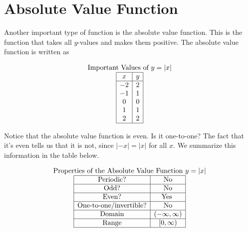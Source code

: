 \documentclass[nooutcomes]{ximera}
\begin{document}
\newpage


\section{Absolute Value Function}
Another important type of function is the absolute value function.  This is the function that takes all $y$-values and makes them positive.  The absolute value function is written as 

\begin{center}
\end{center}

\begin{center}
\end{center}

\[
\begin{array}{c }
\text{\normalfont Important Values of $y=|x|$} \\
\begin{array}{|c|c|}
 \hline
 x & y\\
 \hline
 -2&2\\ 
-1&1\\ 
0&0\\
 1&1\\
 2&2\\
 \hline
\end{array}
\end{array}
\]

Notice that the absolute value function is even. Is it one-to-one? The fact that it's even tells us that it is not, since $|-x| = |x|$ for all $x$. We summarize this information in the table below.

\[
\begin{array}{c }
\text{\normalfont Properties of the Absolute Value Function } y=|x| \\
\begin{array}{|c|c|}
 \hline
\text{Periodic?} & \text{No} \\ \hline
\text{Odd?} & \text{No} \\ \hline
\text{Even?} & \text{Yes } \\ \hline
\text{One-to-one/invertible?} & \text{No}\\ \hline
\text{Domain} & (-\infty,\infty)\\ \hline
\text{Range} & [0,\infty)\\ \hline
\end{array}
\end{array}
\]
\end{document}
